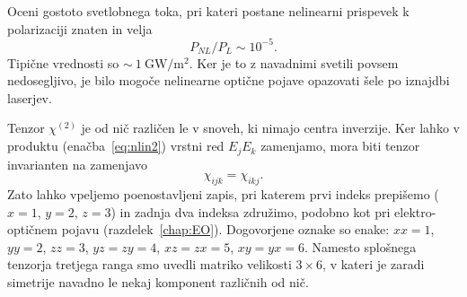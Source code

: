 \begin{definition}
Oceni gostoto svetlobnega toka, pri kateri postane nelinearni 
prispevek k polarizaciji znaten in velja 
 $$P_{NL}/P_L \sim 10^{-5}.$$
Tipične vrednosti so $\sim~1~\si{\giga\watt/\metre^2}$. Ker je to z navadnimi
svetili povsem nedosegljivo, je bilo mogoče nelinearne
optične pojave opazovati šele po iznajdbi laserjev.
\end{definition}
 
Tenzor $\chi^{(2)}$ je od nič različen le v snoveh, ki nimajo centra inverzije. 
Ker lahko v produktu (enačba~\ref{eq:nlin2}) vrstni red $E_j E_k$ zamenjamo, mora biti
tenzor invarianten na zamenjavo
\begin{equation}
\chi_{ijk} = \chi_{ikj}.
\label{eq:chijk}
\end{equation}
Zato lahko vpeljemo poenostavljeni zapis, pri katerem prvi indeks 
prepišemo ($x=1$, $y=2$, $z=3$) in zadnja dva indeksa združimo, 
podobno kot pri elektro-optičnem pojavu (razdelek~\ref{chap:EO}).
Dogovorjene oznake so enake: $xx=1$, $yy=2$, $zz=3$, $yz=zy=4$, 
$xz=zx=5$, $xy=yx=6$. Namesto
splošnega tenzorja tretjega ranga smo uvedli matriko velikosti $3\times6$,
v kateri je zaradi simetrije navadno le nekaj komponent 
različnih od nič. 

